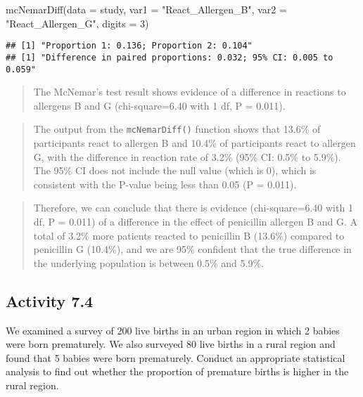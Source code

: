 \documentclass[
]{memoir}
\newenvironment{Shaded}{\begin{snugshade}}{\end{snugshade}}
\newcommand{\AttributeTok}[1]{\textcolor[rgb]{0.77,0.63,0.00}{#1}}
\newcommand{\DecValTok}[1]{\textcolor[rgb]{0.00,0.00,0.81}{#1}}
\newcommand{\FunctionTok}[1]{\textcolor[rgb]{0.00,0.00,0.00}{#1}}
\newcommand{\NormalTok}[1]{#1}
\newcommand{\StringTok}[1]{\textcolor[rgb]{0.31,0.60,0.02}{#1}}
\begin{document}
\begin{Shaded}
\begin{Highlighting}[]
\FunctionTok{mcNemarDiff}\NormalTok{(}\AttributeTok{data =}\NormalTok{ study, }\AttributeTok{var1 =} \StringTok{"React\_Allergen\_B"}\NormalTok{, }\AttributeTok{var2 =} \StringTok{"React\_Allergen\_G"}\NormalTok{, }\AttributeTok{digits =} \DecValTok{3}\NormalTok{)}
\end{Highlighting}
\end{Shaded}

\begin{verbatim}
## [1] "Proportion 1: 0.136; Proportion 2: 0.104"
## [1] "Difference in paired proportions: 0.032; 95% CI: 0.005 to 0.059"
\end{verbatim}

\begin{quote}
The McNemar's test result shows evidence of a difference in reactions to allergens B and G (chi-square=6.40 with 1 df, P = 0.011).
\end{quote}

\begin{quote}
The output from the \texttt{mcNemarDiff()} function shows that 13.6\% of participants react to allergen B and 10.4\% of participants react to allergen G, with the difference in reaction rate of 3.2\% (95\% CI: 0.5\% to 5.9\%). The 95\% CI does not include the null value (which is 0), which is consistent with the P-value being less than 0.05 (P = 0.011).
\end{quote}

\begin{quote}
Therefore, we can conclude that there is evidence (chi-square=6.40 with 1 df, P = 0.011) of a difference in the effect of penicillin allergen B and G. A total of 3.2\% more patients reacted to penicillin B (13.6\%) compared to penicillin G (10.4\%), and we are 95\% confident that the true difference in the underlying population is between 0.5\% and 5.9\%.
\end{quote}

\hypertarget{activity-7.4}{%
\subsection*{Activity 7.4}\label{activity-7.4}}

We examined a survey of 200 live births in an urban region in which 2 babies were born prematurely. We also surveyed 80 live births in a rural region and found that 5 babies were born prematurely. Conduct an appropriate statistical analysis to find out whether the proportion of premature births is higher in the rural region.
\end{document}
